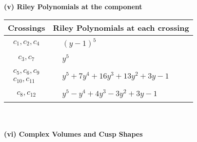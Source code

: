 \documentclass[1p]{elsarticle_modified}
\theoremstyle{definition}
\begin{document}
\newpage\renewcommand{\arraystretch}{1}
\flushleft \textbf{(v) Riley Polynomials at the component}\newline \\
\begin{tabular}{m{50pt}|m{274pt}}
Crossings & \hspace{64pt}Riley Polynomials at each crossing \\
\hline $$\begin{aligned}c_{1},c_{2},c_{4}\end{aligned}$$&$\begin{aligned}
&(y-1)^5
\end{aligned}$\\
\hline $$\begin{aligned}c_{3},c_{7}\end{aligned}$$&$\begin{aligned}
&y^5
\end{aligned}$\\
\hline $$\begin{aligned}c_{5},c_{6},c_{9}\\c_{10},c_{11}\end{aligned}$$&$\begin{aligned}
&y^5+7 y^4+16 y^3+13 y^2+3 y-1
\end{aligned}$\\
\hline $$\begin{aligned}c_{8},c_{12}\end{aligned}$$&$\begin{aligned}
&y^5- y^4+4 y^3-3 y^2+3 y-1
\end{aligned}$\\
\hline
\end{tabular}\\~\\
\newpage\flushleft \textbf{(vi) Complex Volumes and Cusp Shapes}
\end{document}
